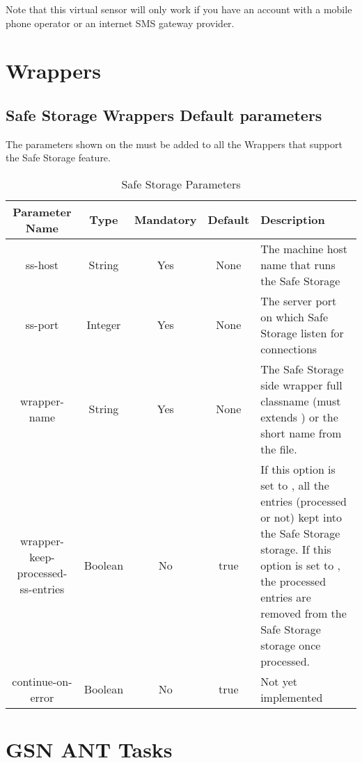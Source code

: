 Note that this virtual sensor will only work if you have an account with a mobile phone operator or an internet SMS gateway provider. 

\section{Wrappers}

\subsection{Safe Storage Wrappers Default parameters}

The parameters shown on the  must be added to all the Wrappers that support the 
Safe Storage feature.

\begin{table*}[!htp]
	\centering
	{\normalfont\footnotesize
	\begin{tabulary}{\textwidth}{|C|C|C|C|J|}%
	\hline
		\textbf{Parameter Name} &
		\textbf{Type} &
		\textbf{Mandatory} &
		\textbf{Default} &
		\textbf{Description} \\
	\hline
	\hline
		ss-host &
		String &	
		Yes &
		None &
		The machine host name that runs the Safe Storage \\
	\hline
		ss-port &
		Integer &	
		Yes &
		None &
		The server port on which Safe Storage listen for connections \\
	\hline
		wrapper-name &
		String &	
		Yes &
		None &
		The Safe Storage side wrapper full classname (must extends ) 
		or the short name from the  file. \\
	\hline
		wrapper-keep-processed-ss-entries &
		Boolean &
		No &
		true &
		If this option is set to , all the entries (processed or not) kept into the Safe Storage storage.
		If this option is set to , the processed entries are removed from the Safe Storage storage once processed. \\
	\hline
		continue-on-error &
		Boolean &	
		No &
		true &
		Not yet implemented \\
	\hline
	\end{tabulary}
	}
	\caption{Safe Storage Parameters}
	\label{table:safe_storage_parameters}
\end{table*}

\section{GSN ANT Tasks \label{quickref_ant_task}}

